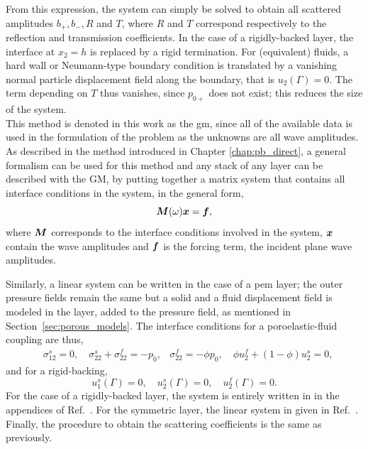 From this expression, the system can simply be solved to obtain all scattered amplitudes $b_+, b_-, R$ and $T$, where $R$ and $T$ correspond respectively to the reflection and transmission coefficients. In the case of a rigidly-backed layer, the interface at $x_2=h$ is replaced by a rigid termination. For (equivalent) fluids, a hard wall or Neumann-type boundary condition is translated by a vanishing normal particle displacement field along the boundary, that is $u_2(\Gamma) = 0$. The term depending on $T$ thus vanishes, since $p_{0+}$ does not exist; this reduces the size of the system.\\

This method is denoted in this work as the \acrfull{gm}, since all of the available data is used in the formulation of the problem as the unknowns are all wave amplitudes. As described in the method introduced in Chapter \ref{chap:pb_direct}, a general formalism can be used for this method and any stack of any layer can be described with the GM, by putting together a matrix system that contains all interface conditions in the system, in the general form,
\begin{equation}
    \boldsymbol M(\omega) \boldsymbol x = \boldsymbol f,
    \label{eq:sys_gm}
\end{equation}
where $\boldsymbol M$ corresponds to the interface conditions involved in the system, $\boldsymbol x$ contain the wave amplitudes and $\boldsymbol f$ is the forcing term, the incident plane wave amplitudes. 

Similarly, a linear system can be written in the case of a \acrshort{pem} layer; the outer pressure fields remain the same but a solid and a fluid displacement field is modeled in the layer, added to the pressure field, as mentioned in Section~\ref{sec:porous_models}. The interface conditions for a poroelastic-fluid coupling are thus, 
\begin{equation}
\begin{aligned}&\sigma_{12}^{s}=0,\quad\sigma_{22}^{s}+\sigma_{22}^{f}=-p_0,&\sigma_{22}^{f}=-\phi p_0, \quad\phi u^f_{2}+(1-\phi)u^s_{2}=0,\end{aligned}\end{equation}
and for a rigid-backing, 
\begin{equation}
    u^s_1(\Gamma) = 0, \quad u^s_2(\Gamma) = 0, \quad u^f_2(\Gamma) = 0.
\end{equation}
For the case of a rigidly-backed layer, the system is entirely written in in the appendices of Ref.~\cite{weisser2016}. For the symmetric layer, the linear system in given in Ref.~\cite{boeckx2005}. Finally, the procedure to obtain the scattering coefficients is the same as previously. 

